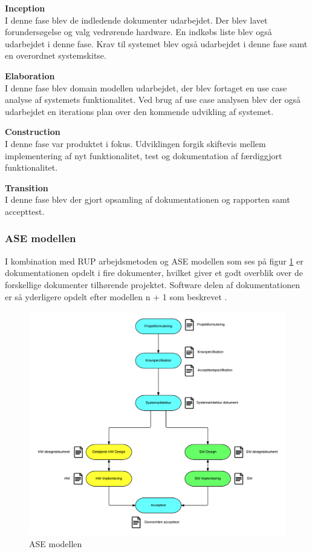 \textbf{Inception}\\
I denne fase blev de indledende dokumenter udarbejdet. Der blev lavet forundersøgelse og valg vedrørende hardware. En indkøbs liste blev også udarbejdet i denne fase. Krav til systemet blev også udarbejdet i denne fase samt en overordnet systemskitse. 

\textbf{Elaboration}\\
I denne fase blev domain modellen udarbejdet, der blev fortaget en use case analyse af systemets funktionalitet. Ved brug af use case analysen blev der også udarbejdet en iterations plan over den kommende udvikling af systemet. 

\textbf{Construction}\\
I denne fase var produktet i fokus. Udviklingen forgik skiftevis mellem implementering af nyt funktionalitet, test og dokumentation af færdiggjort funktionalitet.

\textbf{Transition}\\
I denne fase blev der gjort opsamling af dokumentationen og rapporten samt accepttest.

\newpage

\subsubsection{ASE modellen}
I kombination med RUP arbejdsmetoden og ASE modellen som ses på figur \ref{fig:dokument_udvikling} er dokumentationen opdelt i fire dokumenter, hvilket giver et godt overblik over de forskellige dokumenter tilhørende projektet. Software delen af dokumentationen er så yderligere opdelt efter modellen n + 1 som beskrevet .

\begin{figure}[H]
	\centering
	\includegraphics[width=1\textwidth]{Billeder/Udviklingsproces/ase_model}
	\caption{ASE modellen}
	\label{fig:dokument_udvikling}
\end{figure}

